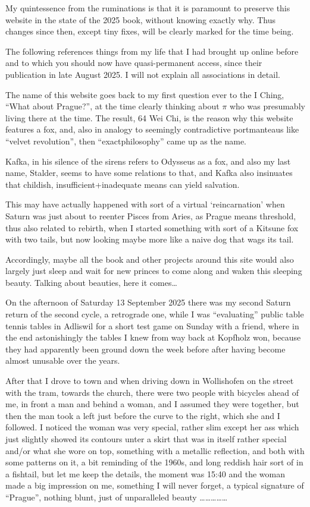 My quintessence
from the ruminations
is
that it is paramount
to preserve this website
in the state of the 2025 book,
without knowing exactly why.
%
Thus changes since then,
except tiny fixes,
will be clearly marked
for the time being.

The following
references things from my life
that I had brought up online before
and to which you should now have
quasi-permanent access,
since their publication
in late August 2025.
%
I will not explain all associations in detail.

The name of this website
goes back to my first question ever to the I Ching,
“What about Prague?”$\!$,
at the time clearly thinking about $\pi$
who was presumably living there at the time.
%
The result,
64 Wei Chi,
is the reason why this website features a fox,
and,
also in analogy
to seemingly contradictive portmanteaus
like “velvet revolution”,
then “exactphilosophy”
came up as the name.

Kafka,
in his silence of the sirens
refers to Odysseus as a fox,
and also my last name,
Stalder,
seems to have some relations to that,
and Kafka also insinuates
that childish, insufficient+inadequate means
can yield salvation.

This may have actually happened
with sort of a virtual ‘reincarnation’
when Saturn was just about to reenter Pisces from Aries,
as Prague means threshold,
thus also related to rebirth,
when I started something
with sort of a Kitsune fox with two tails,
but now looking maybe more
like a naive dog
that wags its tail.

Accordingly,
maybe all the book
and other projects around this site
would also largely just sleep
and wait for new princes to come along
and waken this sleeping beauty.
%
Talking about beauties,
here it comes…

On the afternoon of Saturday 13 September 2025
there was my second Saturn return of the second cycle,
a retrograde one,
while I was “evaluating” public table tennis tables in Adliswil
for a short test game on Sunday with a friend,
where in the end astonishingly the tables I knew from way back at Kopfholz won,
because they had apparently been ground down the week before
after having become almost unusable over the years.

After that I drove to town and when driving down in Wollishofen on the street with the tram, towards the church, there were two people with bicycles ahead of me, in front a man and behind a woman, and I assumed they were together, but then the man took a left just before the curve to the right, which she and I followed. I noticed the woman was very special, rather slim except her ass which just slightly showed its contours unter a skirt that was in itself rather special and/or what she wore on top, something with a metallic reflection, and both with some patterns on it, a bit reminding of the 1960s, and long reddish hair sort of in a fishtail, but let me keep the details, the moment was 15:40 and the woman made a big impression on me, something I will never forget, a typical signature of “Prague”, nothing blunt, just of unparalleled beauty ……………

